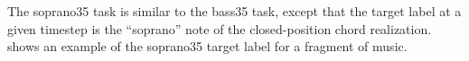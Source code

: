 
The \gls{soprano35} task is similar to the \gls{bass35}
task, except that the target label at a given timestep is
the ``soprano'' note of the \gls{closed-position} chord
realization.  shows an
example of the \gls{soprano35} target label for a fragment
of music.


